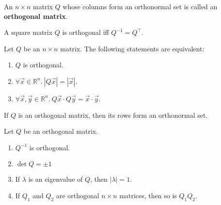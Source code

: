 \documentclass{article}
\begin{document}
\begin{definition}
	An $n \times n$ matrix $Q$ whose columns form an orthonormal set is called an \linebreak \textbf{orthogonal matrix}.
\end{definition}
\begin{theorem}
	A square matrix $Q$ is orthogonal iff $Q^{-1}=Q^\intercal $.
\end{theorem}
\begin{theorem}
	Let $Q$ be an $n\times n$ matrix. The following statements are equivalent:
	\begin{enumerate}
		\item $Q$ is orthogonal.
		\item $\forall \vec x \in \mathbb{R}^n.\:|Q\vec x| = |\vec x|$.
		\item $\forall \vec x, \vec y \in \mathbb{R}^n.\:Q\vec x\cdot Q\vec y = \vec x\cdot \vec y$.
	\end{enumerate}
\end{theorem}
\begin{theorem}
	If $Q$ is an orthogonal matrix, then its rows form an orthonormal set.
\end{theorem}
\begin{theorem}
	Let $Q$ be an orthogonal matrix.
	\begin{enumerate}
		\item $Q^{-1}$ is orthogonal.
		\item $\det Q = \pm 1$
		\item If $\lambda$ is an eigenvalue of $Q$, then $|\lambda|=1$.
		\item If $Q_1$ and $Q_2$ are orthogonal $n\times n$ matrices, then so is $Q_1Q_2$.
	\end{enumerate}
\end{theorem}
\end{document}
